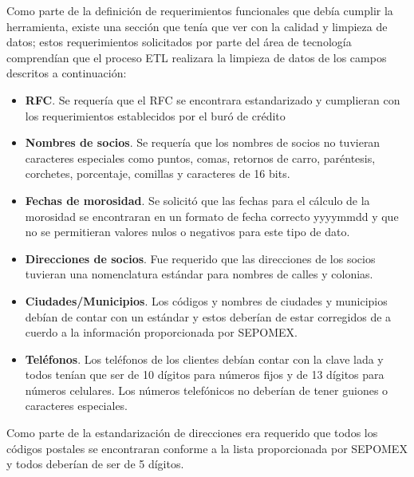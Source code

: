 Como parte de la definición de requerimientos funcionales que debía cumplir la
herramienta, existe una sección que tenía que ver con la calidad y limpieza de
datos; estos requerimientos solicitados por parte del área de tecnología
comprendían que el proceso ETL realizara la limpieza de datos de los campos
descritos a continuación:

\begin{itemize}

\item \textbf{RFC}. Se requería que el RFC se encontrara estandarizado y
  cumplieran con los requerimientos establecidos por el buró de crédito

\item \textbf{Nombres de socios}. Se requería que los nombres de socios no
  tuvieran caracteres especiales como puntos, comas, retornos de carro,
  paréntesis, corchetes, porcentaje, comillas y caracteres de 16 bits.

\item \textbf{Fechas de morosidad}. Se solicitó que las fechas para el cálculo
  de la morosidad se encontraran en un formato de fecha correcto yyyymmdd y que
  no se permitieran valores nulos o negativos para este tipo de dato.

\item \textbf{Direcciones de socios}. Fue requerido que las direcciones de los
  socios tuvieran una nomenclatura estándar para nombres de calles y colonias.

\item \textbf{Ciudades/Municipios}. Los códigos y nombres de ciudades y
  municipios debían de contar con un estándar y estos deberían de estar
  corregidos de a cuerdo a la información proporcionada por SEPOMEX.

\item \textbf{Teléfonos}. Los teléfonos de los clientes debían contar con la
  clave lada y todos tenían que ser de 10 dígitos para números fijos y de 13
  dígitos para números celulares. Los números telefónicos no deberían de tener
  guiones o caracteres especiales.

\end{itemize}

Como parte de la estandarización de direcciones era requerido que todos los
códigos postales se encontraran conforme a la lista proporcionada por SEPOMEX y
todos deberían de ser de 5 dígitos.

\cleardoublepage

